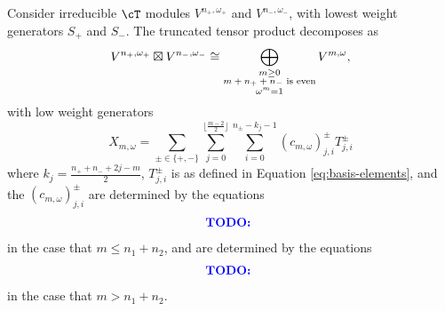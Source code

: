 \documentclass{article}
\begin{document}
\begin{thm}
Consider irreducible $\cT$ modules $V^{n_+, \omega_+}$ and $V^{n_-, \omega_-}$, with lowest weight generators $S_+$ and $S_-$.
The truncated tensor product decomposes as
$$
V^{n_+, \omega_+} \boxtimes V^{n_-, \omega_-} 
\cong 
\bigoplus_{\substack{m \geq 0 \\ \text{$m + n_+  + n_-$ is even} \\ \omega^m = 1}} V^{m, \omega},
$$
with low weight generators 
$$
X_{m, \omega} 
= 
\sum_{\pm \in \{+,-\}}
\sum_{j=0}^{\lfloor\frac{m-2}{2}\rfloor}
\sum_{i=0}^{n_\pm-k_j-1} 
(c_{m,\omega})^{\pm}_{j,i} T^\pm_{j,i}
$$
where
$k_j = \frac{n_+ + n_- + 2j - m}{2}$, $T^\pm_{j,i}$ is as defined in Equation \eqref{eq:basis-elements}, and the $(c_{m,\omega})^{\pm}_{j,i}$ are determined by the equations
\begin{align*}
\textcolor{blue}{\textbf{TODO: }}
\end{align*}
in the case that $m \leq n_1 + n_2$, and are determined by the equations
\begin{align*}
\textcolor{blue}{\textbf{TODO: }}
\end{align*}
in the case that $m > n_1 + n_2$.
\end{thm}
\end{document}
